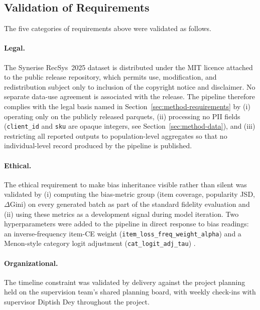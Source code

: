 \documentclass[sigconf,nonacm]{acmart}
\begin{document}
\subsection{Validation of Requirements}
\label{sec:requirements-validation}
The five categories of requirements above were validated as follows.

\paragraph{Legal.}
The Synerise RecSys~2025 dataset is distributed under the MIT licence
attached to the public release repository, which permits use, modification,
and redistribution subject only to inclusion of the copyright notice and
disclaimer. No separate data-use agreement is associated with the release.
The pipeline therefore complies with the legal basis named in
Section~\ref{sec:method-requirements} by (i) operating only on the
publicly released parquets, (ii) processing no PII fields
(\texttt{client\_id} and \texttt{sku} are opaque integers, see
Section~\ref{sec:method-data}), and (iii) restricting all reported
outputs to population-level aggregates so that no individual-level
record produced by the pipeline is published.

\paragraph{Ethical.}
The ethical requirement to make bias inheritance visible rather than
silent was validated by (i) computing the bias-metric group (item
coverage, popularity JSD, $\Delta$Gini) on every generated batch as
part of the standard fidelity evaluation and (ii) using these metrics
as a development signal during model iteration. Two
hyperparameters were added to the pipeline in direct response to bias
readings: an inverse-frequency item-CE weight
(\texttt{item\_loss\_freq\_weight\_alpha}) and a Menon-style category
logit adjustment (\texttt{cat\_logit\_adj\_tau}) \cite{menon2021longtaillearninglogitadjustment}.%

\paragraph{Organizational.}
The timeline constraint was validated by
delivery against the project planning held on the supervision team's
shared planning board, with weekly check-ins with supervisor Diptish Dey throughout
the project. %
\end{document}

